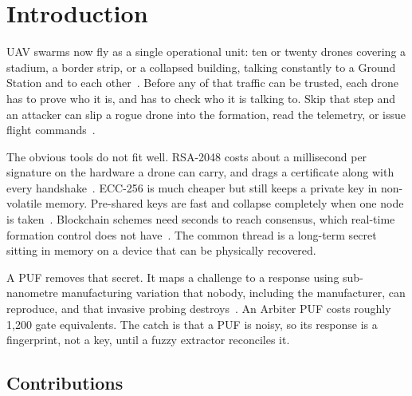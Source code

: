 \documentclass[conference]{IEEEtran}
\begin{document}
\section{Introduction}

UAV swarms now fly as a single operational unit: ten or twenty drones covering a
stadium, a border strip, or a collapsed building, talking constantly to a Ground
Station and to each other~\cite{securing_uav_fanet}. Before any of that traffic
can be trusted, each drone has to prove who it is, and has to check who it is
talking to. Skip that step and an attacker can slip a rogue drone into the
formation, read the telemetry, or issue flight commands~\cite{puf_uav_cross_domain}.

The obvious tools do not fit well. RSA-2048 costs about a millisecond per
signature on the hardware a drone can carry, and drags a certificate along with
every handshake~\cite{puf_lightweight_uav}. ECC-256 is much cheaper but still
keeps a private key in non-volatile memory. Pre-shared keys are fast and
collapse completely when one node is taken~\cite{puf_iot_strong_adversary}.
Blockchain schemes need seconds to reach consensus, which real-time formation
control does not have~\cite{puf_ntu}. The common thread is a long-term secret
sitting in memory on a device that can be physically recovered.

A PUF removes that secret. It maps a challenge to a response using
sub-nanometre manufacturing variation that nobody, including the
manufacturer, can reproduce, and that invasive probing
destroys~\cite{puf_overview}. An Arbiter PUF costs roughly 1{,}200 gate
equivalents. The catch is that a PUF is noisy, so its response is a
fingerprint, not a key, until a fuzzy extractor reconciles it.

\subsection{Contributions}
\end{document}

